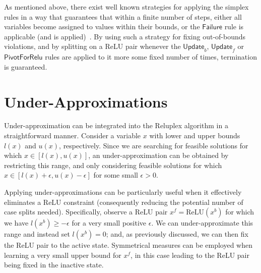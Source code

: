 \documentclass[a4paper]{llncs}
\newcommand{\relu}{\text{ReLU}\xspace{}}
\newcommand{\lb}{l}
\newcommand{\rulename}[1]{\ensuremath{\mathsf{#1}}\xspace}
\newcommand{\irulename}[2]{\ensuremath{\mathsf{#1}_{#2}}\xspace}
\newcommand{\failure}{\rulename{Failure}}
\newcommand{\updateb}{\irulename{Update}{b}}
\newcommand{\updatef}{\irulename{Update}{f}}
\newcommand{\pivotForRelu}{\rulename{PivotForRelu}}
\begin{document}
As mentioned above, there exist well known strategies for applying the simplex rules in a
way that guarantees that within a finite number of steps, either all variables become assigned to
values within their bounds, or the \failure{} rule is applicable (and
is applied)~\cite{Va96}. By using such a strategy for fixing
out-of-bounds violations, and by splitting on a ReLU pair whenever the
\updateb{}, \updatef{} or \pivotForRelu{} rules are applied to it more some
fixed number of times, termination is guaranteed.




\section{Under-Approximations}
\label{appendix:approximation}
Under-approximation can be integrated into the Reluplex algorithm in a straightforward
manner.
Consider a variable $x$ with lower and upper bounds $l(x)$ and
$u(x)$, respectively. Since we are searching for feasible solutions for
which  $x\in [l(x),u(x)]$, an under-approximation 
can be obtained by restricting this range, and only considering
feasible solutions for which $x\in
[l(x)+\epsilon,u(x)-\epsilon]$ for some small $\epsilon>0$.

Applying under-approximations can be particularly useful
when it effectively eliminates a ReLU constraint (consequently reducing the
potential number of case splits needed).
 Specifically, observe a ReLU pair
$x^f=\relu(x^b)$ for which we have 
 $\lb{}(x^b)\geq -\epsilon$ for a very small positive $\epsilon$.
We can under-approximate this range and
instead set $\lb{}(x^b)= 0$; and, as previously discussed, we can then fix
the ReLU pair to the active state. Symmetrical measures
can be employed when learning a very small upper bound for $x^f$, 
 in this case leading to the ReLU pair being fixed in the inactive state.
\end{document}
